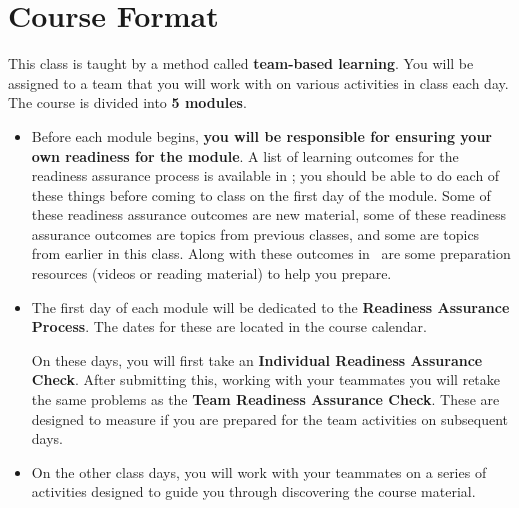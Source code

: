 \documentclass{article}
\begin{document}
\section*{\fontsize{12}{15}\selectfont Course Format}

    This class is taught by a method called {\bf team-based learning}.  You will be assigned to a team that you will work with on various activities in class each day.  The course is divided into {\bf 5 modules}.
    \begin{itemize}
    \item Before each module begins, {\bf you will be responsible for ensuring your own readiness for the module}.  A list of learning outcomes for the readiness assurance process is available in \LMS; you should be able to do each of these things before coming to class on the first day of the module.  Some of these readiness assurance outcomes are new material, some of these readiness assurance outcomes are topics from previous classes, and some are topics from earlier in this class.  Along with these outcomes in \LMS\ are some preparation resources (videos or reading material) to help you prepare.
    \item The first day of each module will be dedicated to the {\bf Readiness Assurance Process}.  The dates for these are located in the course calendar.


    On these days, you will first take an {\bf Individual Readiness Assurance Check}.  After submitting this, working with your teammates you will retake the same problems as the {\bf Team Readiness Assurance Check}.  These are designed to measure if you are prepared for the team activities on subsequent days.

    \item On the other class days, you will work with your teammates on a series of activities designed to guide you through discovering the course material.

    
    \end{itemize}
\end{document}
